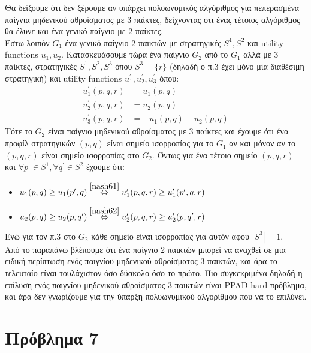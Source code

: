 \documentclass[a4paper,11pt]{article}
\begin{document}
Θα δείξουμε ότι δεν ξέρουμε αν υπάρχει πολυωνυμικός αλγόριθμος για πεπερασμένα παίγνια μηδενικού αθροίσματος με $3$ παίκτες, δείχνοντας ότι ένας τέτοιος αλγόριθμος θα έλυνε και ένα γενικό παίγνιο με $2$ παίκτες.
\\[8pt]
Έστω λοιπόν $G_1$ ένα γενικό παίγνιο $2$ παικτών με στρατηγικές $S^1,S^2$ και utility functions $u_1, u_2$.
Κατασκευάσουμε τώρα ένα παίγνιο $G_2$ από το $G_1$ αλλά με $3$ παίκτες, στρατηγικές $S^1,S^2,S^3$ όπου $S^3 = \{r\}$ (δηλαδή ο π.3 έχει μόνο μία διαθέσιμη στρατηγική) και utility functions $u_1^\prime, u_2^\prime, u_3^\prime$ όπου:
\begin{align}
  u_1^\prime(p,q,r) &= u_1(p,q) \label{nash61}\\
  u_2^\prime(p,q,r) &= u_2(p,q) \label{nash62}\\
  u_3^\prime(p,q,r) &= -u_1(p,q)-u_2(p,q) \nonumber
\end{align}
Τότε το $G_2$ είναι παίγνιο μηδενικού αθροίσματος με $3$ παίκτες και έχουμε ότι ένα προφίλ στρατηγικών $(p,q)$ είναι σημείο ισορροπίας για το $G_1$ αν και μόνον αν το $(p,q,r)$ είναι σημείο ισορροπίας στο $G_2$.
Όντως για ένα τέτοιο σημείο $(p,q,r)$ και $\forall p^\prime \in S^1, \forall q^\prime \in S^2$ έχουμε ότι:
\begin{itemize}
	\item $u_1(p,q) \geq u_1(p^\prime,q) \stackrel{\eqref{nash61}}{\Leftrightarrow} u_1^\prime(p,q,r) \geq u_1^\prime(p^\prime,q,r)$
	\item $u_2(p,q) \geq u_2(p,q^\prime) \stackrel{\eqref{nash62}}{\Leftrightarrow} u_2^\prime(p,q,r) \geq u_2^\prime(p,q^\prime,r)$
\end{itemize}
Ενώ για τον π.3 στο $G_2$ κάθε σημείο είναι ισορροπίας για αυτόν αφού $|S^3|=1$.
\\[8pt]
Από το παραπάνω βλέπουμε ότι ένα παίγνιο $2$ παικτών μπορεί να αναχθεί σε μια ειδική περίπτωση ενός παιγνίου μηδενικού αθροίσματος $3$ παικτών, και άρα το τελευταίο είναι τουλάχιστον όσο δύσκολο όσο το πρώτο.
Πιο συγκεκριμένα δηλαδή η επίλυση ενός παιγνίου μηδενικού αθροίσματος $3$ παικτών είναι PPAD-hard πρόβλημα, και άρα δεν γνωρίζουμε για την ύπαρξη πολυωνυμικού αλγορίθμου που να το επιλύνει.


\section*{Πρόβλημα 7}
\end{document}
